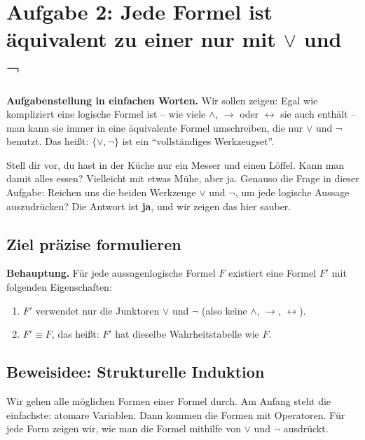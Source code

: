 \documentclass[a4paper,12pt]{article}
\begin{document}
\newpage


\section*{Aufgabe 2: Jede Formel ist \"aquivalent zu einer nur mit $\vee$ und $\neg$}

\textbf{Aufgabenstellung in einfachen Worten.} Wir sollen zeigen:
Egal wie kompliziert eine logische Formel ist -- wie viele $\wedge$,
$\to$ oder $\leftrightarrow$ sie auch enth\"alt -- man kann sie immer
in eine \"aquivalente Formel umschreiben, die nur $\vee$ und $\neg$
benutzt. Das hei{\ss}t: $\{\vee, \neg\}$ ist ein "`vollst\"andiges
Werkzeugset"'.

\begin{analogie}
Stell dir vor, du hast in der K\"uche nur ein Messer und einen
L\"offel. Kann man damit alles essen? Vielleicht mit etwas M\"uhe,
aber ja. Genauso die Frage in dieser Aufgabe: Reichen uns die beiden
Werkzeuge $\vee$ und $\neg$, um jede logische Aussage auszudr\"ucken?
Die Antwort ist \textbf{ja}, und wir zeigen das hier sauber.
\end{analogie}

\subsection*{Ziel pr\"azise formulieren}

\textbf{Behauptung.} F\"ur jede aussagenlogische Formel $F$ existiert
eine Formel $F'$ mit folgenden Eigenschaften:
\begin{enumerate}[nosep]
\item $F'$ verwendet nur die Junktoren $\vee$ und $\neg$ (also keine
      $\wedge$, $\to$, $\leftrightarrow$).
\item $F' \equiv F$, das hei{\ss}t: $F'$ hat dieselbe Wahrheitstabelle
      wie $F$.
\end{enumerate}

\subsection*{Beweisidee: Strukturelle Induktion}

Wir gehen alle m\"oglichen Formen einer Formel durch. Am Anfang steht
die einfachste: atomare Variablen. Dann kommen die Formen mit
Operatoren. F\"ur jede Form zeigen wir, wie man die Formel mithilfe
von $\vee$ und $\neg$ ausdr\"uckt.
\end{document}
